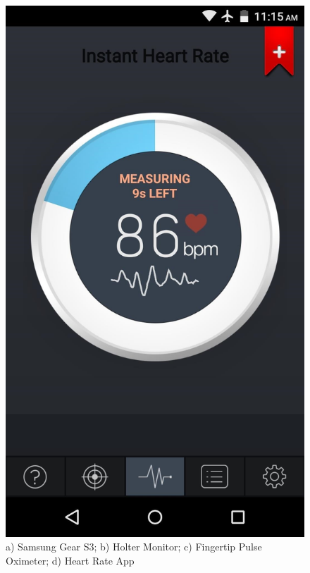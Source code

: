 \begin{figure}[H]
	\includegraphics[scale=0.05]{images/heart_app1.jpg}
    \caption{a) Samsung Gear S3; b) Holter Monitor; c) Fingertip Pulse Oximeter; d) Heart Rate App}
    \label{fig:device_example}
\end{figure}

